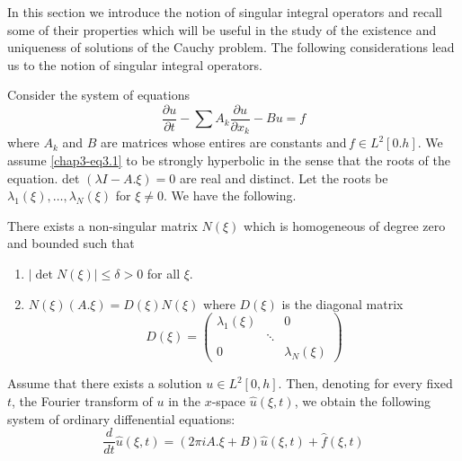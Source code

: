 In this section we introduce the notion of singular integral operators
and recall some of their properties which will be useful in the study
of the existence and uniqueness of solutions of the Cauchy
problem. The following considerations lead us to the notion of
singular integral operators. 

Consider the system of equations 
\begin{equation}
\frac{\partial u}{\partial t} - \sum A_k \frac{\partial u}{\partial
  x_k}- Bu = f \tag{3.1} \label{chap3-eq3.1}
 \end{equation} 
 where $A_k$ and $B$ are matrices whose entires are constants and\,$f
 \in L^2 [0. h]$. We assume \eqref{chap3-eq3.1} to be strongly hyperbolic in the
 sense that the roots of the equation. det $(\lambda I-A.\xi)  = 0$
 are real and distinct. Let the roots be $\lambda_1 (\xi), \ldots,
 \lambda_N (\xi)$ for $\xi \neq 0$. We have the following. 

\setcounter{lemma}{0} 
\begin{lemma}\label{chap3-sec3-lem1}%
There exists a non-singular matrix $N(\xi)$ which is homogeneous of
degree zero and bounded such that  
  \begin{enumerate}
\renewcommand{\labelenumi}{\rm(\theenumi)}
\item $| \det N(\xi) | \leq \delta> 0 $ for all $\xi$.

\item $N (\xi) (A.\xi) = D (\xi) N (\xi)$ where $D(\xi)$ is the
  diagonal matrix  
 $$
 D(\xi)=
 \begin{pmatrix}
\lambda_1 (\xi) &  & 0 \\
 &\ddots\\
 0 & &\lambda_{N}(\xi) 
 \end{pmatrix} 
 $$\pageoriginale
  \end{enumerate}
\end{lemma}

 Assume that there exists a solution $u \in L^2 [0, h]$. Then,
 denoting for every fixed $t$, the Fourier transform of $u$ in the
 $x$-space $\hat{u}(\xi, t)$, we obtain the following system of
 ordinary diffenential equations: 
 \begin{equation}
\frac{d}{dt} \hat{u} (\xi, t) = (2 \pi i A.\xi + B) \hat{u} (\xi, t) +
\hat{f} (\xi, t)\tag{3.2} \label{chap3-eq3.2}
 \end{equation} 

